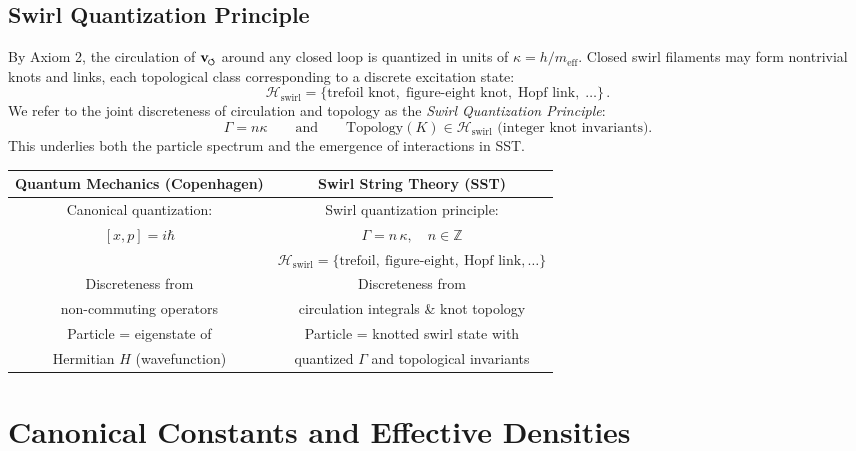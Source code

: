 \documentclass[11pt]{article}
\begin{document}
\subsection{Swirl Quantization Principle}
\label{sec:swirl_quantization}
By Axiom 2, the circulation of $\vswirl$ around any closed loop is quantized in units of $\kappa=h/m_{\text{eff}}$. Closed swirl filaments may form nontrivial knots and links, each topological class corresponding to a discrete excitation state:
\begin{equation}
\mathcal{H}_{\text{swirl}} = \{\text{trefoil knot},\; \text{figure-eight knot},\; \text{Hopf link},\;\dots\}\,.
\end{equation}
We refer to the joint discreteness of circulation and topology as the \emph{Swirl Quantization Principle}:
\[
    \Gamma = n\kappa \qquad \text{and} \qquad \text{Topology}(K)\in \mathcal{H}_{\text{swirl}} \text{ (integer knot invariants)}.
\]
This underlies both the particle spectrum and the emergence of interactions in SST.

\begin{center}\setlength{\tabcolsep}{5pt}
\begin{tabular}{|c|c|}
\hline
\textbf{Quantum Mechanics (Copenhagen)} & \textbf{Swirl String Theory (SST)} \\
\hline
Canonical quantization: & Swirl quantization principle: \\
$[x, p] = i \hbar$ & $\displaystyle \Gamma = n\,\kappa,\quad n\in\mathbb{Z}$ \\[6pt]
& $\displaystyle \mathcal{H}_{\text{swirl}} = \{\text{trefoil},\ \text{figure-eight},\ \text{Hopf link},\dots\}$ \\
\hline
Discreteness from & Discreteness from \\
non-commuting operators & circulation integrals \& knot topology \\
\hline
Particle = eigenstate of & Particle = knotted swirl state with \\
Hermitian $H$ (wavefunction) & quantized $\Gamma$ and topological invariants \\
\hline
\end{tabular}
\end{center}

\section{Canonical Constants and Effective Densities}
\label{sec:canonical_constants}
\end{document}
